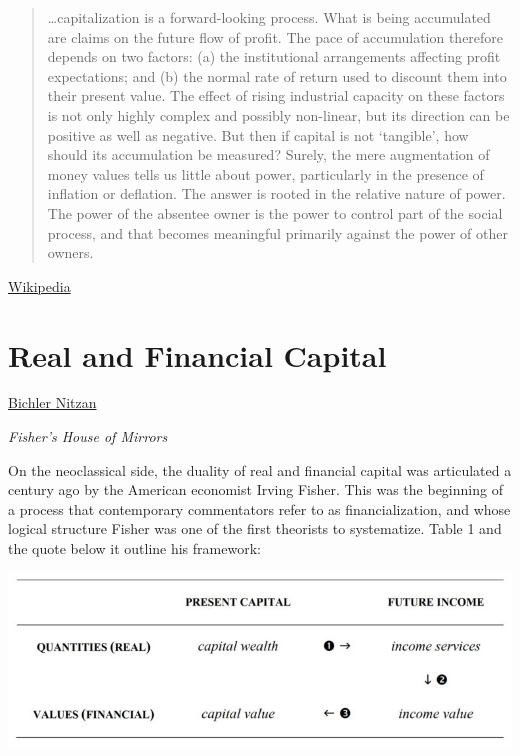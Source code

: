 \documentclass[
]{book}
\begin{document}
\begin{quote}
\ldots capitalization is a forward-looking process. What is being accumulated are claims on the future flow of profit. The pace of accumulation therefore depends on two factors: (a) the institutional arrangements affecting profit expectations; and (b) the normal rate of return used to discount them into their present value. The effect of rising industrial capacity on these factors is not only highly complex and possibly non-linear, but its direction can be positive as well as negative. But then if capital is not `tangible', how should its accumulation be measured? Surely, the mere augmentation of money values tells us little about power, particularly in the presence of inflation or deflation. The answer is rooted in the relative nature of power. The power of the absentee owner is the power to control part of the social process, and that becomes meaningful primarily against the power of other owners.
\end{quote}

\href{https://en.wikipedia.org/wiki/Differential_accumulation}{Wikipedia}

\hypertarget{real-and-financial-capital}{%
\section{Real and Financial Capital}\label{real-and-financial-capital}}

\href{https://evonomics.com/what-do-economists-mean-when-they-talk-about-capital-accumulation/}{Bichler Nitzan}

\emph{Fisher's House of Mirrors}

On the neoclassical side, the duality of real and financial capital was articulated a century ago by the American economist Irving Fisher. This was the beginning of a process that contemporary commentators refer to as financialization, and whose logical structure Fisher was one of the first theorists to systematize. Table 1 and the quote below it outline his framework:

\includegraphics{fig/fisher_house_of_mirrors.jpg}
\end{document}
